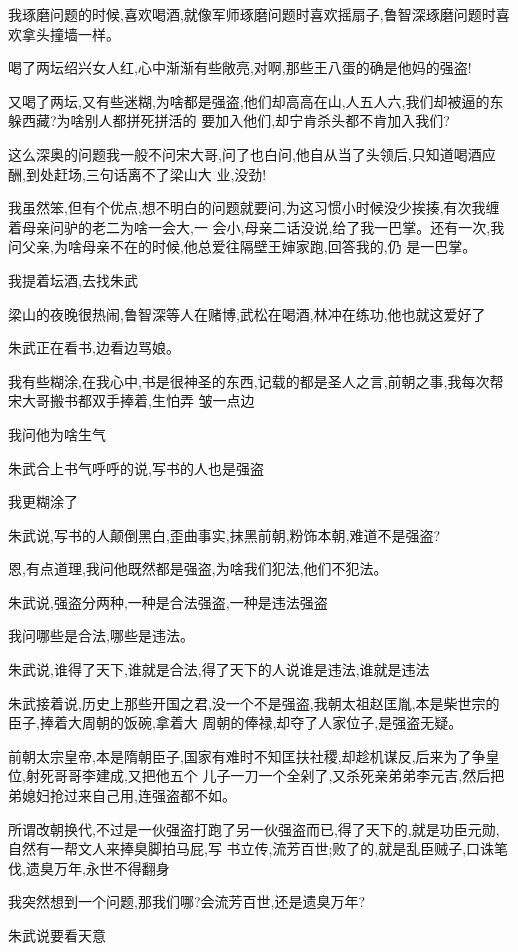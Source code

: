 ﻿\documentclass[12pt]{article}
\begin{document}
我琢磨问题的时候,喜欢喝酒,就像军师琢磨问题时喜欢摇扇子,鲁智深琢磨问题时喜欢拿头撞墙一样。

喝了两坛绍兴女人红,心中渐渐有些敞亮,对啊,那些王八蛋的确是他妈的强盗!

又喝了两坛,又有些迷糊,为啥都是强盗,他们却高高在山,人五人六,我们却被逼的东躲西藏?为啥别人都拼死拼活的
要加入他们,却宁肯杀头都不肯加入我们?

这么深奥的问题我一般不问宋大哥,问了也白问,他自从当了头领后,只知道喝酒应酬,到处赶场,三句话离不了梁山大
业,没劲!

我虽然笨,但有个优点,想不明白的问题就要问,为这习惯小时候没少挨揍,有次我缠着母亲问驴的老二为啥一会大,一
会小,母亲二话没说,给了我一巴掌。还有一次,我问父亲,为啥母亲不在的时候,他总爱往隔壁王婶家跑,回答我的,仍
是一巴掌。

我提着坛酒,去找朱武

梁山的夜晚很热闹,鲁智深等人在赌博,武松在喝酒,林冲在练功,他也就这爱好了\dldots

朱武正在看书,边看边骂娘。

我有些糊涂,在我心中,书是很神圣的东西,记载的都是圣人之言,前朝之事,我每次帮宋大哥搬书都双手捧着,生怕弄
皱一点边

我问他为啥生气

朱武合上书气呼呼的说,写书的人也是强盗

我更糊涂了

朱武说,写书的人颠倒黑白,歪曲事实,抹黑前朝,粉饰本朝,难道不是强盗?

恩,有点道理,我问他既然都是强盗,为啥我们犯法,他们不犯法。

朱武说,强盗分两种,一种是合法强盗,一种是违法强盗

我问哪些是合法,哪些是违法。

朱武说,谁得了天下,谁就是合法,得了天下的人说谁是违法,谁就是违法

朱武接着说,历史上那些开国之君,没一个不是强盗,我朝太祖赵匡胤,本是柴世宗的臣子,捧着大周朝的饭碗,拿着大
周朝的俸禄,却夺了人家位子,是强盗无疑。

前朝太宗皇帝,本是隋朝臣子,国家有难时不知匡扶社稷,却趁机谋反,后来为了争皇位,射死哥哥李建成,又把他五个
儿子一刀一个全剁了,又杀死亲弟弟李元吉,然后把弟媳妇抢过来自己用,连强盗都不如。

所谓改朝换代,不过是一伙强盗打跑了另一伙强盗而已,得了天下的,就是功臣元勋,自然有一帮文人来捧臭脚拍马屁,写
书立传,流芳百世;败了的,就是乱臣贼子,口诛笔伐,遗臭万年,永世不得翻身

我突然想到一个问题,那我们哪?会流芳百世,还是遗臭万年?

朱武说要看天意\dldots
\end{document}
